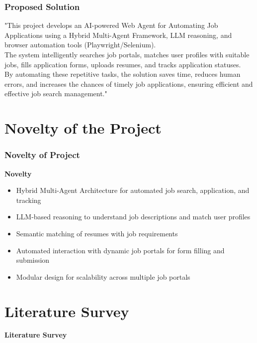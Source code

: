 \documentclass{beamer}
\begin{document}
\begin{frame}
\frametitle{Proposed Solution}
"This project develops an AI-powered Web Agent for Automating Job Applications using a Hybrid Multi-Agent Framework, LLM reasoning, and browser automation tools (Playwright/Selenium). 
\\
The system intelligently searches job portals, matches user profiles with suitable jobs, fills application forms, uploads resumes, and tracks application statuses. 
\\
By automating these repetitive tasks, the solution saves time, reduces human errors, and increases the chances of timely job applications, ensuring efficient and effective job search management."
\end{frame}

\section{Novelty of the Project}

\begin{frame}
\frametitle{Novelty of Project}
    \textbf{Novelty}
    \begin{itemize}
        \item Hybrid Multi-Agent Architecture for automated job search, application, and tracking
        \item LLM-based reasoning to understand job descriptions and match user profiles
        \item Semantic matching of resumes with job requirements
        \item Automated interaction with dynamic job portals for form filling and submission
        \item Modular design for scalability across multiple job portals
    \end{itemize}
\end{frame}



\section{Literature Survey}

\begin{frame}
\centering
\Huge \textbf{Literature Survey}
\end{frame}
\end{document}
